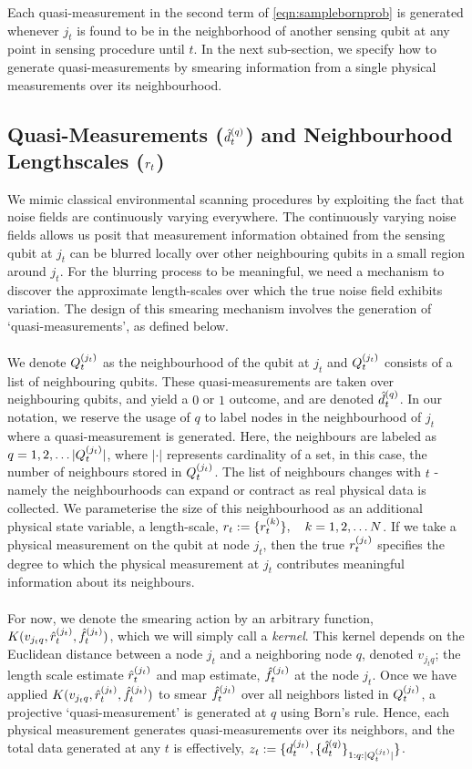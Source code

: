 Each quasi-measurement in the second term of \cref{eqn:samplebornprob} is generated whenever $j_t$ is found to be in the neighborhood of another sensing qubit at any point in sensing procedure until $t$. In the next sub-section, we specify how to generate quasi-measurements by smearing information from a single physical measurements over its neighbourhood. 

\subsection{Quasi-Measurements ($\hat{d}^{( q )}_{t}$) and Neighbourhood Lengthscales ($r_{ t}$)}

We mimic classical environmental scanning procedures by exploiting the fact that noise fields are continuously varying everywhere. The continuously varying noise fields allows us posit that  measurement information obtained from the sensing qubit at $j_t$ can be blurred locally over other neighbouring qubits in a small region around $j_t$. For the blurring process to be meaningful, we need a mechanism to discover the approximate length-scales over which the true noise field exhibits variation. The design of this smearing mechanism involves the generation of `quasi-measurements', as defined below.\\
\\
We denote $Q^{( j_t )}_{t}$ as the neighbourhood of the qubit at $j_t$ and $Q^{( j_t )}_{t}$ consists of a list of neighbouring qubits. These quasi-measurements are taken over neighbouring qubits, and yield a $0$ or $1$ outcome, and are denoted $\hat{d}^{( q )}_{t}$. In our notation, we reserve the usage of $q$ to label nodes in the neighbourhood of $j_t$ where a quasi-measurement is generated. Here, the neighbours are labeled as $q = 1, 2, \hdots |Q^{( j_t )}_{t}|$, where $|\cdot|$ represents cardinality of a set, in this case, the number of neighbours stored in $Q^{( j_t )}_{t}$. The list of neighbours changes with $t$ - namely the neighbourhoods can expand or contract as real physical data is collected. We parameterise the size of this neighbourhood as an additional physical state variable, a length-scale, $r_{ t}:= \{r^{( k )}_{t}\}, \quad  k= 1, 2, \hdots N $. If we take a physical measurement on the qubit at node $j_t$, then the true $r^{( j_t )}_{t}$ specifies the degree to which the physical measurement at $j_t$ contributes meaningful information about its neighbours. \\
\\
For now, we denote the smearing action by an arbitrary function, $K(v_{j_tq},\hat{r}^{( j_t )}_{t}, \hat{f}^{( j_t )}_{t})$, which we will simply call a \textit{kernel}. This kernel depends on the Euclidean distance between a node $j_t$ and a neighboring node $q$, denoted $v_{j_tq}$; the length scale estimate $\hat{r}^{( j_t )}_{t}$ and map estimate, $\hat{f}^{( j_t )}_{t}$ at the node $j_t$. Once we have applied $K(v_{j_tq},\hat{r}^{( j_t )}_{t}, \hat{f}^{( j_t )}_{t})$ to smear $\hat{f}^{( j_t )}_{t}$ over all neighbors listed in $Q^{( j_t )}_{t}$, a projective `quasi-measurement' is generated at $q$ using Born's rule. Hence, each physical measurement generates quasi-measurements over its neighbors, and the total data generated at any $t$ is effectively, $z_t := \{d^{( j_t )}_{t}, \{ \hat{d}^{( q )}_{t} \}_{1:q:|Q^{( j_t )}_{t}|}\}$.\\
